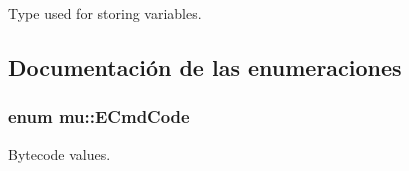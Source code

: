 Type used for storing variables. 



\subsection{Documentación de las enumeraciones}
\subsubsection[{\texorpdfstring{E\+Cmd\+Code}{ECmdCode}}]{\setlength{\rightskip}{0pt plus 5cm}enum {\bf mu\+::\+E\+Cmd\+Code}}\hypertarget{namespacemu_ab77181e591bebd278bf9c7a2e30ad40e}{}\label{namespacemu_ab77181e591bebd278bf9c7a2e30ad40e}


Bytecode values. 

